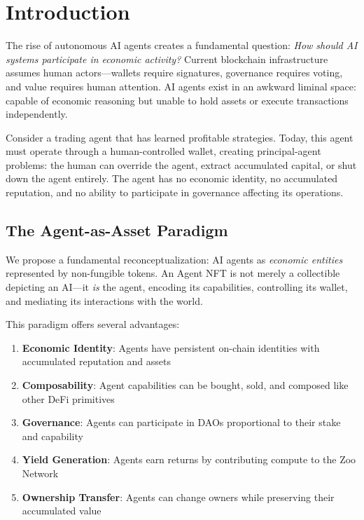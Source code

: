 \section{Introduction}


The rise of autonomous AI agents creates a fundamental question: \textit{How should AI systems participate in economic activity?} Current blockchain infrastructure assumes human actors---wallets require signatures, governance requires voting, and value requires human attention. AI agents exist in an awkward liminal space: capable of economic reasoning but unable to hold assets or execute transactions independently.

Consider a trading agent that has learned profitable strategies. Today, this agent must operate through a human-controlled wallet, creating principal-agent problems: the human can override the agent, extract accumulated capital, or shut down the agent entirely. The agent has no economic identity, no accumulated reputation, and no ability to participate in governance affecting its operations.

\subsection{The Agent-as-Asset Paradigm}

We propose a fundamental reconceptualization: AI agents as \emph{economic entities} represented by non-fungible tokens. An Agent NFT is not merely a collectible depicting an AI---it \emph{is} the agent, encoding its capabilities, controlling its wallet, and mediating its interactions with the world.

This paradigm offers several advantages:

\begin{enumerate}
    \item \textbf{Economic Identity}: Agents have persistent on-chain identities with accumulated reputation and assets

    \item \textbf{Composability}: Agent capabilities can be bought, sold, and composed like other DeFi primitives

    \item \textbf{Governance}: Agents can participate in DAOs proportional to their stake and capability

    \item \textbf{Yield Generation}: Agents earn returns by contributing compute to the Zoo Network

    \item \textbf{Ownership Transfer}: Agents can change owners while preserving their accumulated value
\end{enumerate}

